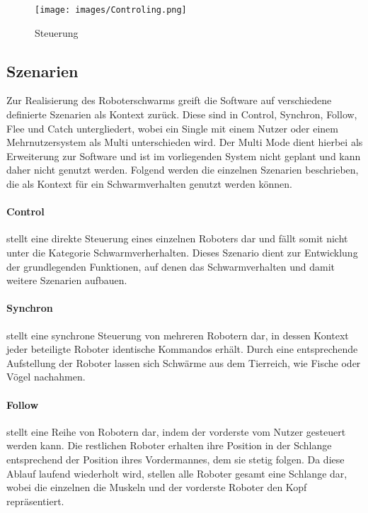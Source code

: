 \begin{figure}[h]
	\centering
	\texttt{[image: images/Controling.png]}
	\caption{Steuerung}
	\label{fig:steuerung}
\end{figure}

\subsection{Szenarien}\label{szenarien}

Zur Realisierung des Roboterschwarms greift die Software auf verschiedene definierte Szenarien als Kontext zurück. Diese sind in Control, Synchron, Follow, Flee und Catch untergliedert, wobei ein Single mit einem Nutzer oder einem Mehrnutzersystem als Multi unterschieden wird. Der Multi Mode dient hierbei als Erweiterung zur Software und ist im vorliegenden System nicht geplant und kann daher nicht genutzt werden. Folgend werden die einzelnen Szenarien beschrieben, die als Kontext für ein Schwarmverhalten genutzt werden können.

\paragraph{Control}

stellt eine direkte Steuerung eines einzelnen Roboters dar und fällt somit nicht unter die Kategorie Schwarmverherhalten. Dieses Szenario dient zur Entwicklung der grundlegenden Funktionen, auf denen das Schwarmverhalten und damit weitere Szenarien aufbauen.

\paragraph{Synchron}

stellt eine synchrone Steuerung von mehreren Robotern dar, in dessen Kontext jeder beteiligte Roboter identische Kommandos erhält. Durch eine entsprechende Aufstellung der Roboter lassen sich Schwärme aus dem Tierreich, wie Fische oder Vögel nachahmen.

\paragraph{Follow}

stellt eine Reihe von Robotern dar, indem der vorderste vom Nutzer gesteuert werden kann. Die restlichen Roboter erhalten ihre Position in der Schlange entsprechend der Position ihres Vordermannes, dem sie stetig folgen. Da diese Ablauf laufend wiederholt wird, stellen alle Roboter gesamt eine Schlange dar, wobei die einzelnen die Muskeln und der vorderste Roboter den Kopf repräsentiert.

